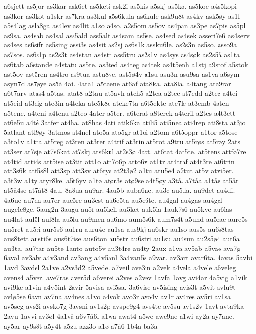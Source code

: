 {a6sjett
as5jor
as3kar
ask6et
as5keti
ask2i
as5kis
a5skj
as5ko.
as5koe
a4s5kopi
as3kor
as3kot
a1skr
as7kra
as3kul
a5s6kula
as6kule
ask9u8t
as4kv
ask5øy
as1l
a5s4lag
asla8ga
as4lev
as4lit
a1so
a4so.
a2s5om
as5ov
as4pan
as3pe
as7pis
as5pl
as9sa.
as4sab
as4sal
ass5ald
ass5alt
as4sam
as5se.
as4sed
as4sek
asseri7e6
as4serv
as4ses
as6sifr
as5sing
assi3s
as4sit
as2sj
as6s1k
assku6le.
as2s3n
as5so.
asso9a
as7sos.
as6s1p
as2s3t
as4stan
as4str
ass5tru
as2s1v
as4sys
as4søk
as2s5å
as1ta
as6tab
a6stande
a4statu
as5te.
as3ted
as4teg
as4tek
as4t5enh
a1stj
a9stof
a5stok
ast5ov
ast5ren
as4tro
as9tua
astu8ve.
ast5ø4v
a1su
asu3n
asu9sa
as1va
a6sym
asyn7d
as7øye
as5å
4at.
4ata1
a5taene
at6af
ata8ka.
ata8la.
a4tang
ata9rar
a6t7arv
atas4
a5tas.
atat8
a2tau
at5avh
atch5
a2tea
a2tec
at7edd
a2tee
a4tei
at5eid
at3eig
ate3in
a4teka
ate5k8e
ateke7ta
a6t5ekte
ate7le
at3emb
4aten
a5tene.
a4teni
a4tenu
a2teo
4ater
a5ter.
a6terat
a8terek
a4teril
a2tes
a4t3ett
at6e5u
a4té
3atfer
at4ha.
at8has
4ati
atik6ka
atili5
ati5nea
ati4rep
ati8sta
at3jo
5atlant
atl9øy
3atmos
at4nel
ato5a
ato5gr
at1oi
a2tom
a6t5oppr
a1tor
a5tose
a3to1v
a1tra
at5reg
at3ren
at3rer
a4trif
at3rin
at5rot
a9tru
at5røs
at5røy
2ats
at3ser
at7sje
at7s6kat
at7skj
ats6kul
at2s3ø
4att.
at6tat
4at5te.
at5tens
attfø7re
at4tid
atti4s
att5ise
at3tit
att1o
att7o6p
atto6v
at1tr
at4traf
at4t3re
at6trin
att3s6k
att5s8l
att3sp
att3sv
at6tys
at2t3ø2
a1tu
atu5e4
a2tut
at5v
atvi5er.
a3t3w
a1ty
atyr8ke.
a5t6yv
a1tø
atør3s
atø9se
a4t5øy
a3tå.
a7tåa
a1tåe
at5år
at5å4se
at7åt8
4au.
8a8ua
au9ar.
4au5b
auba6ne.
au3c
au5da.
au9det
au4di.
4a6ue
au7en
au7er
aue5re
au3est
au6e5ta
au5e6te.
au4gal
au4gas
au4gel
augele8ge.
5aug2n
3augu
au5i
au5keli
au5ket
auk5la
1auk7s6
au5kve
au6las
au4lat
aul5l
aul8la
au5lu
au9men
au6mo
aum5s6k
aum7s4t
a5und
au5rae
aure5s
au5ret
au5ri
aur5s6
au1ru
auru4e
au1sa
aus9kj
au6skr
au1so
aus5s
au6s8tas
aus8tett
austi6s
aus6t7ise
aus6ton
au5str
au6stri
au1su
au4sun
au2s5ø4
aut6a
au3ta.
au7tar
au5te
1auto
auto5v
au3t4re
au4ty
2aux
a1va
av5ab
a5vae
ava7g
6aval
av3alv
a4v3and
av3ang
a4v5anl
3a4van5s
a9var.
av3art
avar6ta.
4avas
5avbi
1avd
3avdel
2a1ve
a2ve3d2
a5vede.
a7veil
ave3in
a2vek
a4vela
a4vele
a5veleg
avens4
a5ver.
ave7ras
aver5d
a6verei
a2ves
a2vev
1avfa
1avg
avi4ar
4a5vig
a1vik
avi9ke
a1vin
a4v5int
2avir
5avisa
avi5sa.
3a6vise
av5ising
avis3t
a5vit
avlu9t
avlø5se
6avn
av7na
av4nes
a1vo
a4vok
avo3r
avo4v
av1r
av4res
av5ri
av1sa
av5seg
avs2i
avsko7g
3avsni
av1s2p
avspe9g4
avs4te
av5su
av1s2v
1avt
avta9ka
2avu
1avvi
av3øl
4a1vå
a6v7å6l
a1wa
awat4
a5we
awe9ne
a1wi
ay2a
ay7ane.
ay5ar
ay9s8t
a5y4t
a5zu
azz3o
a1ø
a7å6
1b4a
ba3a
}
